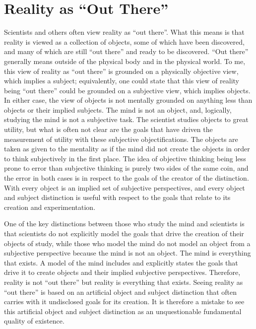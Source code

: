 \section{Reality as ``Out There''}

Scientists and others often view reality as ``out there''.  What this
means is that reality is viewed as a collection of objects, some of
which have been discovered, and many of which are still ``out there''
and ready to be discovered.  ``Out there'' generally means outside of
the physical body and in the physical world.  To me, this view of
reality as ``out there'' is grounded on a physically objective view,
which implies a subject; equivalently, one could state that this view
of reality being ``out there'' could be grounded on a subjective view,
which implies objects.  In either case, the view of objects is not
mentally grounded on anything less than objects or their implied
subjects.  The mind is not an object, and, logically, studying the
mind is not a subjective task.  The scientist studies objects to great
utility, but what is often not clear are the goals that have driven
the measurement of utility with these subjective objectifications.
The objects are taken as given to the mentality as if the mind did not
create the objects in order to think subjectively in the first place.
The idea of objective thinking being less prone to error than
subjective thinking is purely two sides of the same coin, and the
error in both cases is in respect to the goals of the creator of the
distinction.  With every object is an implied set of subjective
perspectives, and every object and subject distinction is useful with
respect to the goals that relate to its creation and experimentation.

One of the key distinctions between those who study the mind and
scientists is that scientists do not explicitly model the goals that
drive the creation of their objects of study, while those who model
the mind do not model an object from a subjective perspective because
the mind is not an object.  The mind is everything that exists.  A
model of the mind includes and explicitly states the goals that drive
it to create objects and their implied subjective perspectives.
Therefore, reality is not ``out there'' but reality is everything that
exists.  Seeing reality as ``out there'' is based on an artificial
object and subject distinction that often carries with it undisclosed
goals for its creation.  It is therefore a mistake to see this
artificial object and subject distinction as an unquestionable
fundamental quality of existence.

